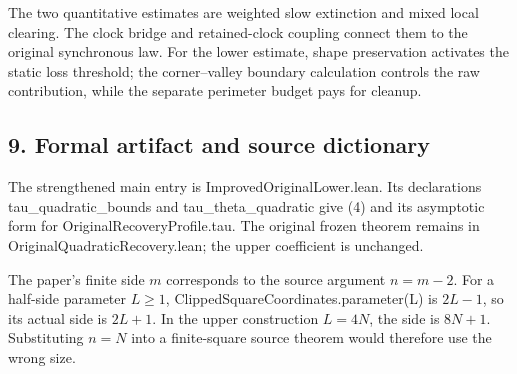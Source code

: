 \documentclass[
  11pt,
  a4paper,
]{article}
\begin{document}
The two quantitative estimates are weighted slow extinction and mixed
local clearing. The clock bridge and retained-clock coupling connect
them to the original synchronous law. For the lower estimate, shape
preservation activates the static loss threshold; the corner--valley
boundary calculation controls the raw contribution, while the separate
perimeter budget pays for cleanup.

\subsection{9. Formal artifact and source
dictionary}\label{formal-artifact-and-source-dictionary}

The strengthened main entry is ImprovedOriginalLower.lean. Its
declarations tau\_\allowbreak quadratic\_\allowbreak bounds and tau\_\allowbreak theta\_\allowbreak quadratic give (4)
and its asymptotic form for OriginalRecoveryProfile.tau. The original
frozen theorem remains in OriginalQuadraticRecovery.lean; the upper
coefficient is unchanged.

The paper's finite side \(m\) corresponds to the source argument
\(n=m-2\). For a half-side parameter \(L\geq1\),
ClippedSquareCoordinates.parameter(L) is \(2L-1\), so its actual side is
\(2L+1\). In the upper construction \(L=4N\), the side is \(8N+1\).
Substituting \(n=N\) into a finite-square source theorem would therefore
use the wrong size.
\end{document}
